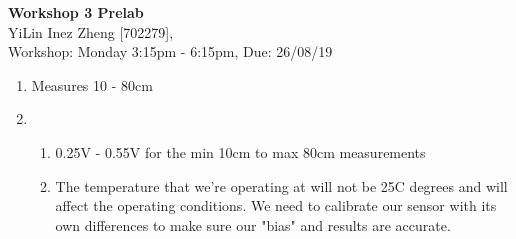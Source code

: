 \documentclass[11pt]{article}
\begin{document}
\begin{center}
\textbf{\Large{Workshop 3 Prelab}}\\
YiLin Inez Zheng [702279], \\
Workshop: Monday 3:15pm - 6:15pm, Due: 26/08/19  
\end{center}

\begin{enumerate}
    \item %
    Measures 10 - 80cm
    \item %
    \begin{enumerate}
        \item %
        0.25V - 0.55V for the min 10cm to max 80cm measurements
        \item %
        The temperature that we're operating at will not be 25C degrees and will affect the operating conditions. We need to calibrate our sensor with its own differences to make sure our "bias" and results are accurate.  
    \end{enumerate}
\end{enumerate}
\end{document}
